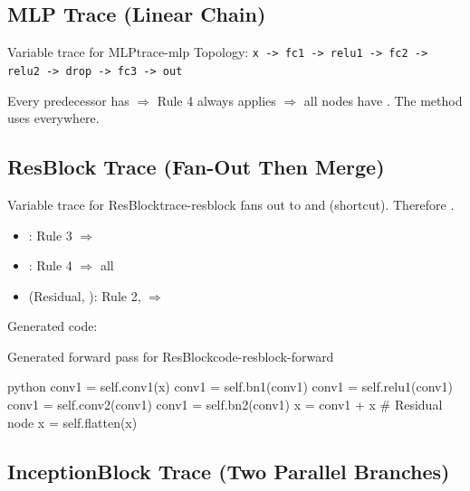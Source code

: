 \documentclass{nngraph-en}
\begin{document}
\subsection{MLP Trace (Linear Chain)}

\begin{exbox}{Variable trace for MLP}{trace-mlp}
Topology:
\texttt{x -> fc1 -> relu1 -> fc2 -> relu2 -> drop -> fc3 -> out}

Every predecessor has  $\Rightarrow$ Rule 4
always applies $\Rightarrow$ all nodes have .
The  method uses  everywhere.
\end{exbox}

\subsection{ResBlock Trace (Fan-Out Then Merge)}

\begin{exbox}{Variable trace for ResBlock}{trace-resblock}
 fans out to  and  (shortcut).
Therefore .

\begin{itemize}
    \item {}: Rule 3 $\Rightarrow$ 
    \item {}: Rule 4 $\Rightarrow$ all
    \item {} (Residual, ): Rule 2,
     $\Rightarrow$ 
\end{itemize}

Generated code:
\begin{codebox}{Generated forward pass for ResBlock}{code-resblock-forward}
\begin{amzcode}{python}
conv1 = self.conv1(x)
conv1 = self.bn1(conv1)
conv1 = self.relu1(conv1)
conv1 = self.conv2(conv1)
conv1 = self.bn2(conv1)
x     = conv1 + x       # Residual node
x     = self.flatten(x)
\end{amzcode}
\end{codebox}
\end{exbox}

\subsection{InceptionBlock Trace (Two Parallel Branches)}
\end{document}
